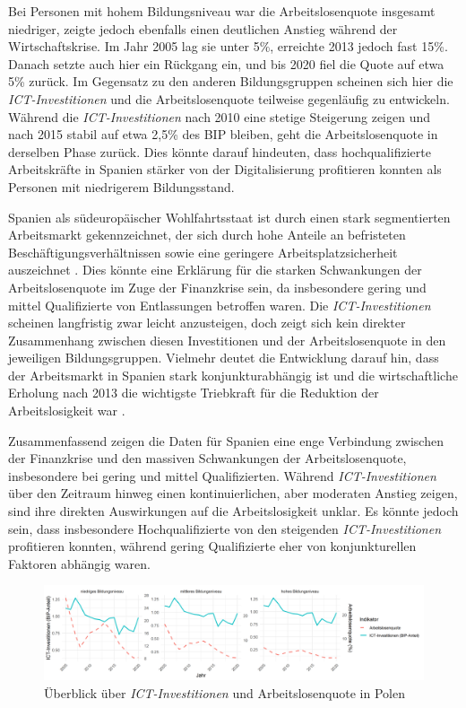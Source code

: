 Bei Personen mit hohem Bildungsniveau war die Arbeitslosenquote insgesamt niedriger, 
zeigte jedoch ebenfalls einen deutlichen Anstieg während der Wirtschaftskrise. Im Jahr 
2005 lag sie unter 5\%, erreichte 2013 jedoch fast 15\%. Danach setzte auch hier ein 
Rückgang ein, und bis 2020 fiel die Quote auf etwa 5\% zurück. Im Gegensatz zu den 
anderen Bildungsgruppen scheinen sich hier die \textit{\ac{ICT}-Investitionen} und 
die Arbeitslosenquote teilweise gegenläufig zu entwickeln. Während die 
\textit{\ac{ICT}-Investitionen} nach 2010 eine stetige Steigerung zeigen und nach 
2015 stabil auf etwa 2,5\% des BIP bleiben, geht die Arbeitslosenquote in derselben 
Phase zurück. Dies könnte darauf hindeuten, dass hochqualifizierte Arbeitskräfte in 
Spanien stärker von der Digitalisierung profitieren konnten als Personen mit 
niedrigerem Bildungsstand.

Spanien als südeuropäischer Wohlfahrtsstaat ist durch einen stark segmentierten 
Arbeitsmarkt gekennzeichnet, der sich durch hohe Anteile an befristeten 
Beschäftigungsverhältnissen sowie eine geringere Arbeitsplatzsicherheit auszeichnet 
\parencite[vgl.][159–160]{bentolila2012two}. Dies könnte eine Erklärung für die starken 
Schwankungen der Arbeitslosenquote im Zuge der Finanzkrise sein, da insbesondere 
gering und mittel Qualifizierte von Entlassungen betroffen waren. Die 
\textit{\ac{ICT}-Investitionen} scheinen langfristig zwar leicht anzusteigen, doch zeigt 
sich kein direkter Zusammenhang zwischen diesen Investitionen und der Arbeitslosenquote 
in den jeweiligen Bildungsgruppen. Vielmehr deutet die Entwicklung darauf hin, dass der 
Arbeitsmarkt in Spanien stark konjunkturabhängig ist und die wirtschaftliche Erholung 
nach 2013 die wichtigste Triebkraft für die Reduktion der Arbeitslosigkeit war 
\parencite[vgl.][157–159]{bentolila2012two}.

Zusammenfassend zeigen die Daten für Spanien eine enge Verbindung zwischen der 
Finanzkrise und den massiven Schwankungen der Arbeitslosenquote, insbesondere bei 
gering und mittel Qualifizierten. Während \textit{\ac{ICT}-Investitionen} über den 
Zeitraum hinweg einen kontinuierlichen, aber moderaten Anstieg zeigen, sind ihre 
direkten Auswirkungen auf die Arbeitslosigkeit unklar. Es könnte jedoch sein, dass 
insbesondere Hochqualifizierte von den steigenden \textit{\ac{ICT}-Investitionen} 
profitieren konnten, während gering Qualifizierte eher von konjunkturellen 
Faktoren abhängig waren.

\begin{figure}[htbp]
    \centering
    \includegraphics[width=\textwidth]{assets/plot_poland.png}
    \caption{Überblick über \textit{\ac{ICT}-Investitionen} und Arbeitslosenquote 
    in Polen}
    \label{fig:poland}
\end{figure}

